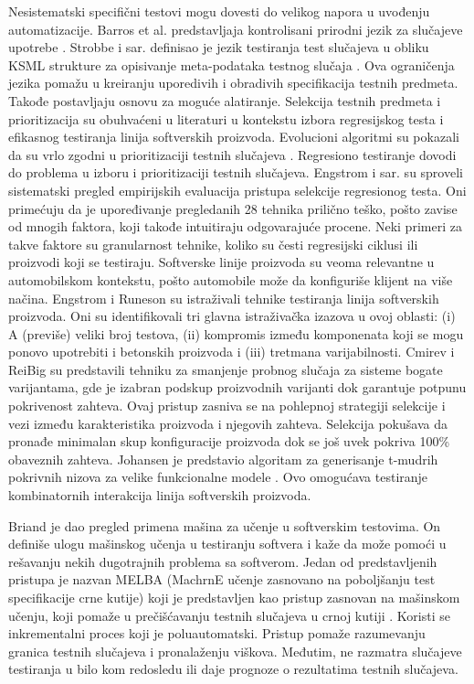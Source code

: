 \documentclass[a4paper]{article}
\begin{document}
Nesistematski specifični testovi mogu dovesti do velikog napora u uvođenju automatizacije. Barros et al. predstavljaja kontrolisani prirodni jezik za slučajeve upotrebe \cite{ref28}. Strobbe i sar. definisao je jezik testiranja test slučajeva u obliku KSML strukture za opisivanje meta-podataka testnog slučaja \cite{ref30}. Ova ograničenja jezika pomažu u kreiranju uporedivih i obradivih specifikacija testnih predmeta. Takođe postavljaju osnovu za moguće alatiranje. Selekcija testnih predmeta i prioritizacija su obuhvaćeni u literaturi u kontekstu izbora regresijskog testa i efikasnog testiranja linija softverskih proizvoda. Evolucioni algoritmi su pokazali da su vrlo zgodni u prioritizaciji testnih slučajeva \cite{ref29}. Regresiono testiranje dovodi do problema u izboru i prioritizaciji testnih slučajeva. Engstrom i sar. \cite{ref35} su sproveli sistematski pregled empirijskih evaluacija pristupa selekcije regresionog testa. Oni primećuju da je upoređivanje pregledanih 28 tehnika prilično teško, pošto zavise od mnogih faktora, koji takođe intuitiraju odgovarajuće procene. Neki primeri za takve faktore su granularnost tehnike, koliko su česti regresijski ciklusi ili proizvodi koji se testiraju. Softverske linije proizvoda su veoma relevantne u automobilskom kontekstu, pošto automobile može da konfiguriše klijent na više načina. Engstrom i Runeson \cite{ref31} su istraživali tehnike testiranja linija softverskih proizvoda. Oni su identifikovali tri glavna istraživačka izazova u ovoj oblasti: (i) A (previše) veliki broj testova, (ii) kompromis između komponenata koji se mogu ponovo upotrebiti i betonskih proizvoda i (iii) tretmana varijabilnosti. Cmirev i ReiBig \cite{ref32} su predstavili tehniku za smanjenje probnog slučaja za sisteme bogate varijantama, gde je izabran podskup proizvodnih varijanti dok garantuje potpunu pokrivenost zahteva. Ovaj pristup zasniva se na pohlepnoj strategiji selekcije i vezi između karakteristika proizvoda i njegovih zahteva. Selekcija pokušava da pronađe minimalan skup konfiguracije proizvoda dok se još uvek pokriva 100\% obaveznih zahteva.
Johansen je predstavio algoritam za generisanje t-mudrih pokrivnih nizova za velike funkcionalne modele \cite{ref33}. Ovo omogućava testiranje kombinatornih interakcija linija softverskih proizvoda.
\bigbreak

Briand \cite{ref26} je dao pregled primena mašina za učenje u softverskim testovima. On definiše ulogu mašinskog učenja u testiranju softvera i kaže da može pomoći u rešavanju nekih dugotrajnih problema sa softverom. Jedan od predstavljenih pristupa je nazvan MELBA (MachrnE učenje zasnovano na poboljšanju test specifikacije crne kutije) koji je predstavljen kao pristup zasnovan na mašinskom učenju, koji pomaže u prečišćavanju testnih slučajeva u crnoj kutiji \cite{ref34}. Koristi se inkrementalni proces koji je poluautomatski. Pristup pomaže razumevanju granica testnih slučajeva i pronalaženju viškova. Međutim, ne razmatra slučajeve testiranja u bilo kom redosledu ili daje prognoze o rezultatima testnih slučajeva.
\bigbreak
\end{document}
